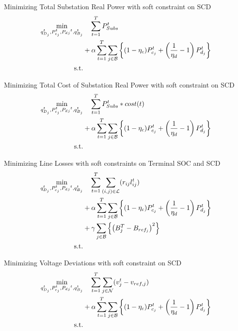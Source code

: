 Minimizing Total Substation Real Power with soft constraint on SCD
\begin{gather}
	\begin{align}
		\min_{
		\substack{
		q_{D_j}^t, P_{c_j}^t, P_d{_j}^t, q_{B_j}^t}
		} 
		\vspace{-15ex} %
		& \quad
		\sum_{t = 1}^{T} P_{Subs}^t \\
		&+ \alpha \sum_{t = 1}^{T} \sum_{j \in \mathcal{B}} \left\{ (1- \eta_c)P_{c_j}^t + \left(\frac{1}{\eta_d}-1\right) P_{d_j}^t \right\} \nonumber\\
		\text{s.t.} & {}\nonumber
	\end{align}
\end{gather}

Minimizing Total Cost of Substation Real Power with soft constraint on SCD
\begin{gather}
	\begin{align}
		\min_{
		\substack{
		q_{D_j}^t, P_{c_j}^t, P_d{_j}^t, q_{B_j}^t}
		} 
		\vspace{-15ex} %
		& \quad
		\sum_{t = 1}^{T} P_{Subs}^t*cost(t) \\
		&+ \alpha \sum_{t = 1}^{T} \sum_{j \in \mathcal{B}} \left\{ (1- \eta_c)P_{c_j}^t + \left(\frac{1}{\eta_d}-1\right) P_{d_j}^t \right\} \nonumber\\
		\text{s.t.} & {}\nonumber
	\end{align}
\end{gather}

Minimizing Line Losses with soft constraints on Terminal SOC and SCD
\begin{gather}
	\begin{align}
		\min_{
		\substack{
		q_{D_j}^t, P_{c_j}^t, P_d{_j}^t, q_{B_j}^t}
		} 
		\vspace{-15ex} %
		& \quad
		\sum_{t = 1}^{T} \sum_{(i, j) \in \mathcal{L}} (r_{ij}l_{ij}^t) \\
		&+ \alpha \sum_{t = 1}^{T} \sum_{j \in \mathcal{B}} \left\{ (1- \eta_c)P_{c_j}^t + \left(\frac{1}{\eta_d}-1\right) P_{d_j}^t \right\} \nonumber\\
		&+ \gamma \sum_{j \in \mathcal{B}} \left\{ \left(B^{T}_{j} - B_{ref_{j}}\right)^2\right\} \nonumber\\
		\text{s.t.} & {}\nonumber
	\end{align}
\end{gather}

Minimizing Voltage Deviations with soft constraint on SCD
\begin{gather}
	\begin{align}
		\min_{
		\substack{
		q_{D_j}^t, P_{c_j}^t, P_d{_j}^t, q_{B_j}^t}
		} 
		\vspace{-15ex} %
		& \quad
		\sum_{t = 1}^{T} \sum_{j \in \mathcal{N}} (v^t_{j} - v_{ref, j}) \\
		&+ \alpha \sum_{t = 1}^{T} \sum_{j \in \mathcal{B}} \left\{ (1- \eta_c)P_{c_j}^t + \left(\frac{1}{\eta_d}-1\right) P_{d_j}^t \right\} \nonumber\\
		\text{s.t.} & {}\nonumber
	\end{align}
\end{gather}

